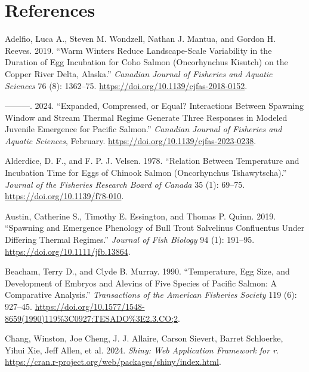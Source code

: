 \documentclass[webpdf,large,contemporary,namedate]{oup-authoring-template}
\newlength{\cslhangindent}
\newenvironment{CSLReferences}[2] %
 {\begin{list}{}{%
  \setlength{\itemindent}{0pt}
  \setlength{\leftmargin}{0pt}
  \setlength{\parsep}{0pt}
  \ifodd #1
   \setlength{\leftmargin}{\cslhangindent}
   \setlength{\itemindent}{-1\cslhangindent}
  \fi
  \setlength{\itemsep}{#2\baselineskip}}}
 {\end{list}}
\theoremstyle{thmstyleone}
\theoremstyle{thmstyletwo}
\theoremstyle{thmstylethree}
\begin{document}
\section*{References}\label{references}

\label{refs}
\begin{CSLReferences}{1}{0}
Adelfio, Luca A., Steven M. Wondzell, Nathan J. Mantua, and Gordon H.
Reeves. 2019. {``Warm Winters Reduce Landscape-Scale Variability in the
Duration of Egg Incubation for Coho Salmon (Oncorhynchus Kisutch) on the
Copper River Delta, Alaska.''} \emph{Canadian Journal of Fisheries and
Aquatic Sciences} 76 (8): 1362--75.
\url{https://doi.org/10.1139/cjfas-2018-0152}.

---------. 2024. {``Expanded, Compressed, or Equal? Interactions Between
Spawning Window and Stream Thermal Regime Generate Three Responses in
Modeled Juvenile Emergence for Pacific Salmon.''} \emph{Canadian Journal
of Fisheries and Aquatic Sciences}, February.
\url{https://doi.org/10.1139/cjfas-2023-0238}.

Alderdice, D. F., and F. P. J. Velsen. 1978. {``Relation Between
Temperature and Incubation Time for Eggs of Chinook Salmon (Oncorhynchus
Tshawytscha).''} \emph{Journal of the Fisheries Research Board of
Canada} 35 (1): 69--75. \url{https://doi.org/10.1139/f78-010}.

Austin, Catherine S., Timothy E. Essington, and Thomas P. Quinn. 2019.
{``Spawning and Emergence Phenology of Bull Trout Salvelinus Confluentus
Under Differing Thermal Regimes.''} \emph{Journal of Fish Biology} 94
(1): 191--95. \url{https://doi.org/10.1111/jfb.13864}.

Beacham, Terry D., and Clyde B. Murray. 1990. {``Temperature, Egg Size,
and Development of Embryos and Alevins of Five Species of Pacific
Salmon: A Comparative Analysis.''} \emph{Transactions of the American
Fisheries Society} 119 (6): 927--45.
\url{https://doi.org/10.1577/1548-8659(1990)119\%3C0927:TESADO\%3E2.3.CO;2}.

Chang, Winston, Joe Cheng, J. J. Allaire, Carson Sievert, Barret
Schloerke, Yihui Xie, Jeff Allen, et al. 2024. \emph{Shiny: Web
Application Framework for r}.
\url{https://cran.r-project.org/web/packages/shiny/index.html}.


\end{CSLReferences}
\end{document}
